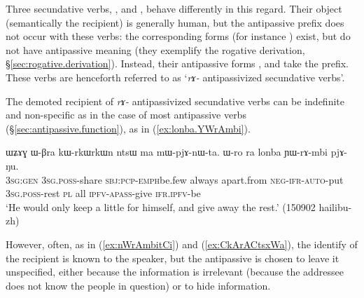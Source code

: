 Three secundative verbs, ,  and  , behave differently in this regard. Their object (semantically the recipient) is generally human, but the  antipassive prefix does not occur with these verbs: the corresponding forms (for instance ) exist, but do not have antipassive meaning  (they exemplify the rogative derivation, §\ref{sec:rogative.derivation}). Instead, their antipassive forms ,  and  take the  prefix. These verbs are henceforth referred to as `\textit{rɤ-} antipassivized secundative verbs'.

The demoted recipient of \textit{rɤ-} antipassivized secundative verbs can be indefinite and non-specific as in the case of most antipassive verbs (§\ref{sec:antipassive.function}), as  in (\ref{ex:lonba.YWrAmbi}).
\largerpage
\begin{exe}
\ex \label{ex:lonba.YWrAmbi}
\gll  ɯʑɤɣ ɯ-βra kɯ-rkɯ\redp{}rkɯn ntsɯ ma mɯ-pjɤ-nɯ-ta. ɯ-ro ra lonba ɲɯ-rɤ-mbi pjɤ-ŋu. \\
\textsc{3sg}:\textsc{gen} \textsc{3sg}.\textsc{poss}-share \textsc{sbj}:\textsc{pcp}-\textsc{emph}\redp{}be.few always apart.from \textsc{neg}-\textsc{ifr}-\textsc{auto}-put \textsc{3sg}.\textsc{poss}-rest \textsc{pl} all \textsc{ipfv}-\textsc{apass}-give \textsc{ifr}.\textsc{ipfv}-be \\
\glt  `He would only keep a little for himself, and give away the rest.' (150902 hailibu-zh) 
\end{exe}

However, often, as in (\ref{ex:nWrAmbitCi}) and (\ref{ex:CkArACtsxWa}), the identify of the recipient is known to the speaker, but the antipassive is chosen to leave it unspecified, either because the information is irrelevant (because the addressee does not know the people in question) or to hide information.

